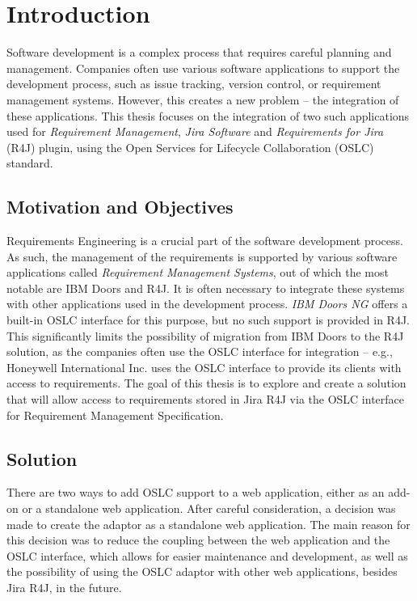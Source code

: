 
% 

\chapter{Introduction}
Software development is a complex process that requires careful planning and management. Companies often use various software applications to support the development process, such as issue tracking, version control, or requirement management systems. However, this creates a new problem -- the integration of these applications. This thesis focuses on the integration of two such applications used for \emph{Requirement Management}, \emph{Jira Software} and \emph{Requirements for Jira} (R4J) plugin, using the Open Services for Lifecycle Collaboration (OSLC) standard.

\section{Motivation and Objectives}
Requirements Engineering is a crucial part of the software development process. As such, the management of the requirements is supported by various software applications called \emph{Requirement Management Systems}, out of which the most notable are IBM Doors and R4J. It is often necessary to integrate these systems with other applications used in the development process. \emph{IBM Doors NG} offers a built-in OSLC interface for this purpose, but no such support is provided in R4J. This significantly limits the possibility of migration from IBM Doors to the R4J solution, as the companies often use the OSLC interface for integration -- e.g., Honeywell International Inc. uses the OSLC interface to provide its clients with access to requirements. The goal of this thesis is to explore and create a solution that will allow access to requirements stored in Jira R4J via the OSLC interface for Requirement Management Specification.

\section{Solution}
There are two ways to add OSLC support to a web application, either as an add-on or a standalone web application. After careful consideration, a decision was made to create the adaptor as a standalone web application. The main reason for this decision was to reduce the coupling between the web application and the OSLC interface, which allows for easier maintenance and development, as well as the possibility of using the OSLC adaptor with other web applications, besides Jira R4J, in the future. 

